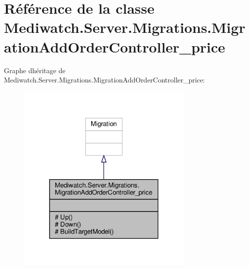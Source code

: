 \hypertarget{class_mediwatch_1_1_server_1_1_migrations_1_1_migration_add_order_controller__price}{}\section{Référence de la classe Mediwatch.\+Server.\+Migrations.\+Migration\+Add\+Order\+Controller\+\_\+price}
\label{class_mediwatch_1_1_server_1_1_migrations_1_1_migration_add_order_controller__price}


Graphe d\textquotesingle{}héritage de Mediwatch.\+Server.\+Migrations.\+Migration\+Add\+Order\+Controller\+\_\+price\+:
\nopagebreak
\begin{figure}[H]
\begin{center}
\leavevmode
\includegraphics[width=246pt]{class_mediwatch_1_1_server_1_1_migrations_1_1_migration_add_order_controller__price__inherit__graph}
\end{center}
\end{figure}



